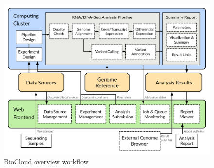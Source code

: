 \begin{figure}[!htbp]
\centering
\includegraphics[width=1\textwidth]{images/overview_workflow}
\caption[BioCloud overview workflow]{BioCloud overview workflow}
\label{fig:overview-workflow}
\end{figure}
